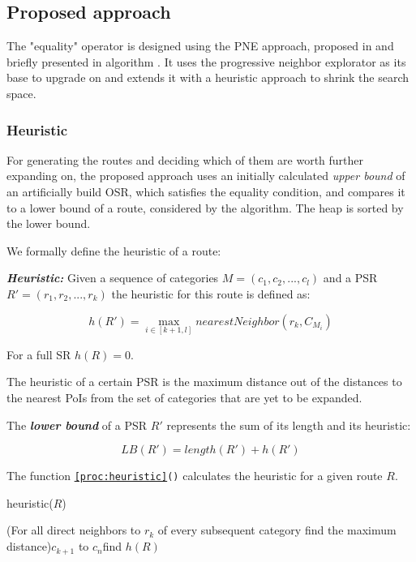 \subsection{Proposed approach} 
\label{sec:approachEO}
The "equality" operator is designed using the PNE approach, proposed in \cite{OSR} and briefly presented in algorithm \texttt{}. It uses the progressive neighbor explorator as its base to upgrade on and extends it with a heuristic approach to shrink the search space.

\subsubsection{Heuristic}
\label{sec:heuristic}
For generating the routes and deciding which of them are worth further expanding on, the proposed approach uses an initially calculated \textit{upper bound} of an artificially build OSR, which satisfies the equality condition, and compares it to a lower bound of a route, considered by the algorithm. The heap is sorted by the lower bound. 

We formally define the heuristic of a route:

\textbf{\textit{Heuristic:}} Given a sequence of categories $M = (c_1, c_2, ..., c_l)$ and a PSR $R' = (r_1, r_2, ..., r_k)$ the heuristic for this route is defined as: 

\begin{equation}
h(R') = \max_{i \in [k+1, l]} nearestNeighbor(r_k, C_{M_{i}})
\end{equation}

For a full SR $h(R) = 0$.

The heuristic of a certain PSR is the maximum distance out of the distances to the nearest PoIs from the set of categories that are yet to be expanded. 

The \textbf{\textit{lower bound}} of a PSR $R'$ represents the sum of its length and its heuristic:

\begin{equation}
LB(R') = length(R') + h(R')
\end{equation}

The function \texttt{\ref{proc:heuristic}()} calculates the heuristic for a given route $R$.

\begin{function}[htb!]
\caption{heuristic($R$)}
\label{proc:heuristic}

	\For(For all direct neighbors to $r_k$ of every subsequent category find the maximum distance){$c_{k+1}$ to $c_n$}{find $h(R)$\;}	

\end{function}

